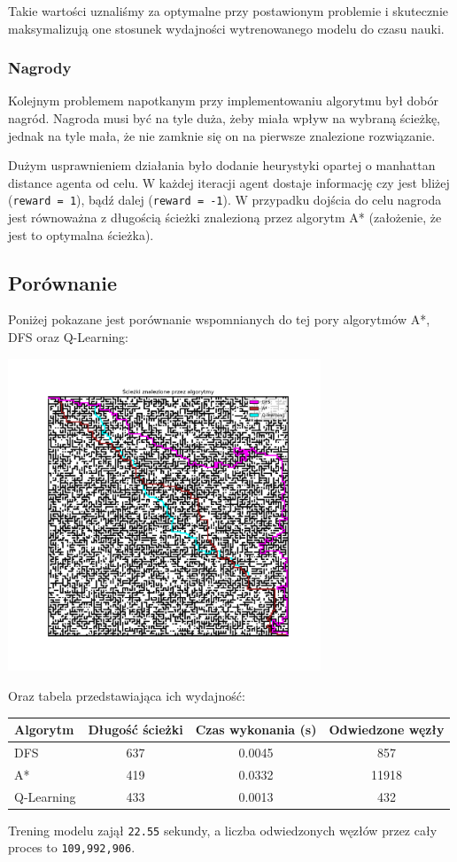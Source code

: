 \documentclass[a4paper,12pt]{article}
\begin{document}
    Takie wartości uznaliśmy za optymalne przy postawionym problemie i skutecznie maksymalizują one stosunek wydajności wytrenowanego modelu do czasu nauki.

    \subsubsection{Nagrody}
    Kolejnym problemem napotkanym przy implementowaniu  algorytmu był dobór nagród.
    Nagroda musi być na tyle duża, żeby miała wpływ na wybraną ścieżkę, jednak na tyle mała, że nie zamknie się on na pierwsze znalezione rozwiązanie.
    
    Dużym usprawnieniem działania było dodanie heurystyki opartej o manhattan distance agenta od celu.
    W każdej iteracji agent dostaje informację czy jest bliżej (\texttt{reward = 1}), bądź dalej (\texttt{reward = -1}).
    W przypadku dojścia do celu nagroda jest równoważna z długością ścieżki znalezioną przez algorytm A* (założenie, że jest to optymalna ścieżka).

    \newpage
    \subsection{Porównanie}
	Poniżej pokazane jest porównanie wspomnianych do tej pory algorytmów A*, DFS oraz Q-Learning:
    \begin{center}
        \includegraphics[width=0.7\textwidth]{../images/qlearning-vs-others.png}    
    \end{center}

    Oraz tabela przedstawiająca ich wydajność:
    \begin{table}[h!]
\centering
\begin{tabular}{|l|c|c|c|}
\hline
\textbf{Algorytm} & \textbf{Długość ścieżki} & \textbf{Czas wykonania (s)} & \textbf{Odwiedzone węzły} \\
\hline
DFS        & 637  & 0.0045  & 857    \\
A*         & 419  & 0.0332  & 11918  \\
Q-Learning & 433  & 0.0013  & 432    \\
\hline
\end{tabular}
\end{table}

    Trening modelu zajął \texttt{22.55} sekundy, a liczba odwiedzonych węzłów przez cały proces to \texttt{109,992,906}.


\end{document}
